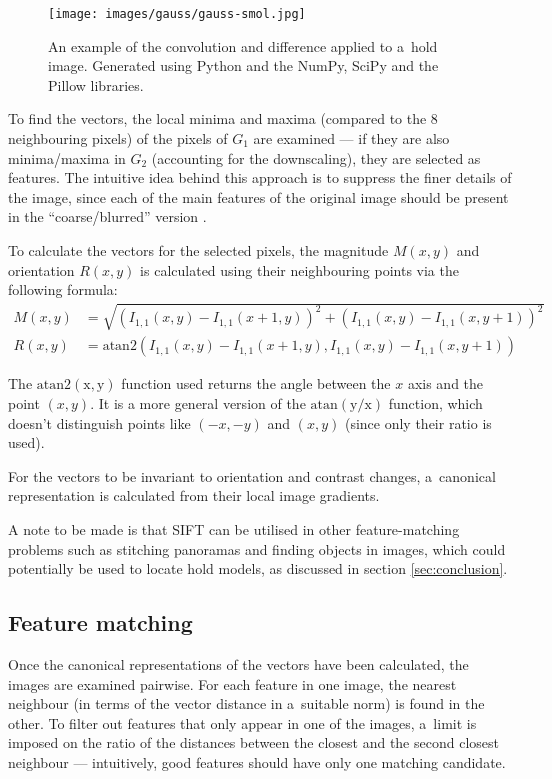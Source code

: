 \begin{figure}
	\centering
	\texttt{[image: images/gauss/gauss-smol.jpg]}
	\caption{An example of the convolution and difference applied to a~hold image. Generated using Python and the NumPy, SciPy and the Pillow libraries.}
	\label{fig:gaussexample}
\end{figure}

To find the vectors, the local minima and maxima (compared to the 8 neighbouring pixels) of the pixels of $G_1$ are examined --- if they are also minima/maxima in $G_2$ (accounting for the downscaling), they are selected as features.
The intuitive idea behind this approach is to suppress the finer details of the image, since each of the main features of the original image should be present in the ``coarse/blurred'' version \cite{scalespace}.

To calculate the vectors for the selected pixels, the magnitude $M(x,y)$ and orientation $R(x,y)$ is calculated using their neighbouring points via the following formula:
\begin{align}
	M(x,y) &= \sqrt{\left(I_{1,1}(x, y) - I_{1,1}(x + 1, y)\right)^2 + \left(I_{1,1}(x,y) - I_{1,1}(x, y + 1)\right)^2} \\[0.7em]
	R(x,y) &= \mathrm{atan2} \left(I_{1,1}(x, y) - I_{1,1}(x + 1, y), I_{1,1}(x,y) - I_{1,1}(x, y + 1)\right)
\end{align}

The $\mathrm{atan2(x, y)}$ function used returns the angle between the $x$ axis and the point $(x, y)$.
It is a more general version of the $\mathrm{atan(y/x)}$ function, which doesn't distinguish points like $(-x, -y)$ and $(x, y)$ (since only their ratio is used).

For the vectors to be invariant to orientation and contrast changes, a~canonical representation is calculated from their local image gradients.

A note to be made is that SIFT can be utilised in other feature-matching problems such as stitching panoramas and finding objects in images, which could potentially be used to locate hold models, as discussed in section \ref{sec:conclusion}.

\subsection{Feature matching}
Once the canonical representations of the vectors have been calculated, the images are examined pairwise.
For each feature in one image, the nearest neighbour (in terms of the vector distance in a~suitable norm) is found in the other.
To filter out features that only appear in one of the images, a~limit is imposed on the ratio of the distances between the closest and the second closest neighbour --- intuitively, good features should have only one matching candidate.

